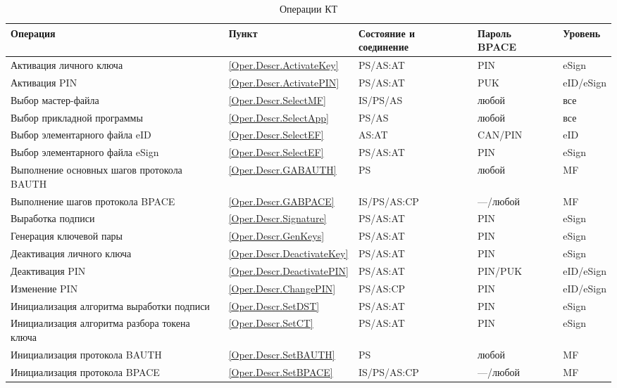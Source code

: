 \begin{table}[p]
\caption{Операции КТ}
\label{Table.Oper.List}
\begin{tabular}{|p{7.5cm}|p{1.3cm}|p{2.6cm}|p{1.8cm}| p{1.7cm}|}
\hline
Операция & Пункт & Состояние и соединение & Пароль BPACE & Уровень \\
\hline
\hline
Активация личного ключа & \ref{Oper.Descr.ActivateKey} & PS/AS:AT & PIN & eSign \\
\hline
Активация PIN & \ref{Oper.Descr.ActivatePIN} & PS/AS:AT & PUK & eID/eSign \\
\hline
Выбор мастер-файла & \ref{Oper.Descr.SelectMF} & IS/PS/AS & любой & все \\
\hline
Выбор прикладной программы & \ref{Oper.Descr.SelectApp} & PS/AS & любой & все \\
\hline
Выбор элементарного файла eID & \ref{Oper.Descr.SelectEF} & AS:AT & CAN/PIN & eID \\
\hline
Выбор элементарного файла eSign & \ref{Oper.Descr.SelectEF} & PS/AS:AT & PIN & eSign \\
\hline
Выполнение основных шагов протокола BAUTH & \ref{Oper.Descr.GABAUTH} & PS & любой & MF \\
\hline
Выполнение шагов протокола BPACE & \ref{Oper.Descr.GABPACE} & IS/PS/AS:CP & ---/любой & MF \\
\hline
Выработка подписи & \ref{Oper.Descr.Signature} & PS/AS:AT & PIN & eSign \\
\hline
Генерация ключевой пары & \ref{Oper.Descr.GenKeys} & PS/AS:AT & PIN & eSign \\
\hline
Деактивация личного ключа & \ref{Oper.Descr.DeactivateKey}  & PS/AS:AT & PIN & eSign \\
\hline
Деактивация PIN & \ref{Oper.Descr.DeactivatePIN}  & PS/AS:AT & PIN/PUK & eID/eSign \\
\hline
Изменение PIN & \ref{Oper.Descr.ChangePIN} & PS/AS:CP & PIN & eID/eSign \\
\hline
Инициализация алгоритма выработки подписи & \ref{Oper.Descr.SetDST} & PS/AS:AT & PIN & eSign \\
\hline
Инициализация алгоритма разбора токена ключа & \ref{Oper.Descr.SetCT} & PS/AS:AT & PIN & eSign \\
\hline
Инициализация протокола BAUTH & \ref{Oper.Descr.SetBAUTH} & PS & любой & MF \\
\hline
Инициализация протокола BPACE & \ref{Oper.Descr.SetBPACE} & IS/PS/AS:CP & ---/любой & MF \\

\end{tabular}
\end{table}
